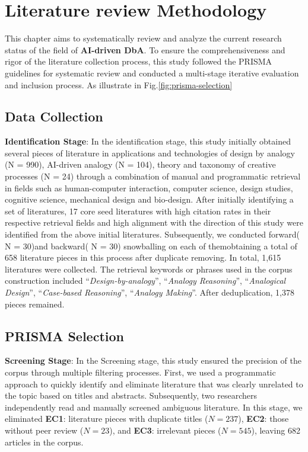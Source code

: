 \section{Literature review Methodology} %
This chapter aims to systematically review and analyze the current research status of the field of \textbf{AI-driven DbA}. To ensure the comprehensiveness and rigor of the literature collection process, this study followed the PRISMA guidelines\cite{page2021prisma} for systematic review and conducted a multi-stage iterative evaluation and inclusion process. As illustrate in Fig.\ref{fig:prisma-selection}

\subsection{Data Collection}
\textbf{Identification Stage}:
In the identification stage, this study initially obtained several pieces of literature in applications and technologies of design by analogy (N = 990), AI-driven analogy (N = 104), theory and taxonomy of creative processes (N = 24) through a combination of manual and programmatic retrieval in fields such as human-computer interaction, computer science, design studies, cognitive science, mechanical design and bio-design. After initially identifying a set of literatures, 17 core seed literatures with high citation rates in their respective retrieval fields and high alignment with the direction of this study were identified from the above initial literatures. Subsequently, we conducted forward( N = 30)and backward( N = 30) snowballing on each of themobtaining a total of 658 literature pieces in this process after duplicate removing. In total, 1,615 literatures were collected. The retrieval keywords or phrases used in the corpus construction included ``\textit{Design-by-analogy}'', ``\textit{Analogy Reasoning}'', ``\textit{Analogical Design}'', ``\textit{Case-based Reasoning}'', ``\textit{Analogy Making}''. After deduplication, 1,378 pieces remained. 
\subsection{PRISMA Selection}
\textbf{Screening Stage}:
In the Screening stage, this study ensured the precision of the corpus through multiple filtering processes. First, we used a programmatic approach to quickly identify and eliminate literature that was clearly unrelated to the topic based on titles and abstracts. Subsequently, two researchers independently read and manually screened ambiguous literature. In this stage, we eliminated \textbf{EC1}: literature pieces with duplicate titles ($N = 237$), \textbf{EC2}: those without peer review ($N = 23$), and \textbf{EC3}: irrelevant pieces ($N = 545$), leaving 682 articles in the corpus.

